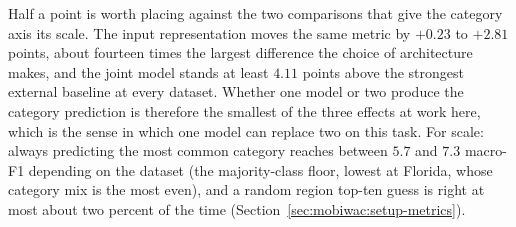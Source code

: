 Half a point is worth placing against the two comparisons that give the category axis its scale. The
input representation moves the same metric by $+0.23$ to $+2.81$ points, about fourteen times the
largest difference the choice of architecture makes, and the joint model stands at least $4.11$ points
above the strongest external baseline at every dataset. Whether one model or two produce the category
prediction is therefore the smallest of the three effects at work here, which is the sense in which
one model can replace two on this task.
For scale: always predicting the most common category reaches between $5.7$ and $7.3$ macro-F1
depending on the dataset (the majority-class floor, lowest at Florida, whose category mix is the
most even), and a random region top-ten guess is right at most about two percent of the time
(Section~\ref{sec:mobiwac:setup-metrics}).

